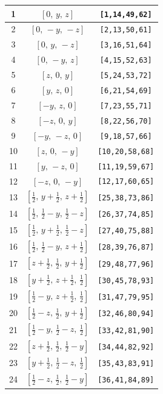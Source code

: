 \documentclass[fleqn,8pt]{jsarticle}
\begin{document}
\begin{longtable}{ccc}
1 & $\left[ 0,\, y,\, z \right]$ & {\tt [1,14,49,62]} \\ \hline
2 & $\left[ 0,\, - y,\, - z \right]$ & {\tt [2,13,50,61]} \\ \hline
3 & $\left[ 0,\, y,\, - z \right]$ & {\tt [3,16,51,64]} \\ \hline
4 & $\left[ 0,\, - y,\, z \right]$ & {\tt [4,15,52,63]} \\ \hline
5 & $\left[ z,\, 0,\, y \right]$ & {\tt [5,24,53,72]} \\ \hline
6 & $\left[ y,\, z,\, 0 \right]$ & {\tt [6,21,54,69]} \\ \hline
7 & $\left[ - y,\, z,\, 0 \right]$ & {\tt [7,23,55,71]} \\ \hline
8 & $\left[ - z,\, 0,\, y \right]$ & {\tt [8,22,56,70]} \\ \hline
9 & $\left[ - y,\, - z,\, 0 \right]$ & {\tt [9,18,57,66]} \\ \hline
10 & $\left[ z,\, 0,\, - y \right]$ & {\tt [10,20,58,68]} \\ \hline
11 & $\left[ y,\, - z,\, 0 \right]$ & {\tt [11,19,59,67]} \\ \hline
12 & $\left[ - z,\, 0,\, - y \right]$ & {\tt [12,17,60,65]} \\ \hline
13 & $\left[ \frac{1}{2},\, y + \frac{1}{2},\, z + \frac{1}{2} \right]$ & {\tt [25,38,73,86]} \\ \hline
14 & $\left[ \frac{1}{2},\, \frac{1}{2} - y,\, \frac{1}{2} - z \right]$ & {\tt [26,37,74,85]} \\ \hline
15 & $\left[ \frac{1}{2},\, y + \frac{1}{2},\, \frac{1}{2} - z \right]$ & {\tt [27,40,75,88]} \\ \hline
16 & $\left[ \frac{1}{2},\, \frac{1}{2} - y,\, z + \frac{1}{2} \right]$ & {\tt [28,39,76,87]} \\ \hline
17 & $\left[ z + \frac{1}{2},\, \frac{1}{2},\, y + \frac{1}{2} \right]$ & {\tt [29,48,77,96]} \\ \hline
18 & $\left[ y + \frac{1}{2},\, z + \frac{1}{2},\, \frac{1}{2} \right]$ & {\tt [30,45,78,93]} \\ \hline
19 & $\left[ \frac{1}{2} - y,\, z + \frac{1}{2},\, \frac{1}{2} \right]$ & {\tt [31,47,79,95]} \\ \hline
20 & $\left[ \frac{1}{2} - z,\, \frac{1}{2},\, y + \frac{1}{2} \right]$ & {\tt [32,46,80,94]} \\ \hline
21 & $\left[ \frac{1}{2} - y,\, \frac{1}{2} - z,\, \frac{1}{2} \right]$ & {\tt [33,42,81,90]} \\ \hline
22 & $\left[ z + \frac{1}{2},\, \frac{1}{2},\, \frac{1}{2} - y \right]$ & {\tt [34,44,82,92]} \\ \hline
23 & $\left[ y + \frac{1}{2},\, \frac{1}{2} - z,\, \frac{1}{2} \right]$ & {\tt [35,43,83,91]} \\ \hline
24 & $\left[ \frac{1}{2} - z,\, \frac{1}{2},\, \frac{1}{2} - y \right]$ & {\tt [36,41,84,89]} \\
\end{longtable}
\end{document}
